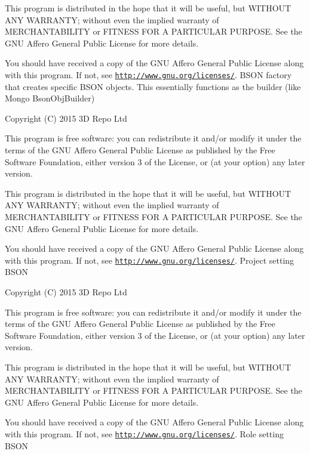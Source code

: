 This program is distributed in the hope that it will be useful, but W\+I\+T\+H\+O\+U\+T A\+N\+Y W\+A\+R\+R\+A\+N\+T\+Y; without even the implied warranty of M\+E\+R\+C\+H\+A\+N\+T\+A\+B\+I\+L\+I\+T\+Y or F\+I\+T\+N\+E\+S\+S F\+O\+R A P\+A\+R\+T\+I\+C\+U\+L\+A\+R P\+U\+R\+P\+O\+S\+E. See the G\+N\+U Affero General Public License for more details.

You should have received a copy of the G\+N\+U Affero General Public License along with this program. If not, see \href{http://www.gnu.org/licenses/}{\tt http\+://www.\+gnu.\+org/licenses/}. B\+S\+O\+N factory that creates specific B\+S\+O\+N objects. This essentially functions as the builder (like Mongo Bson\+Obj\+Builder)

Copyright (C) 2015 3\+D Repo Ltd

This program is free software\+: you can redistribute it and/or modify it under the terms of the G\+N\+U Affero General Public License as published by the Free Software Foundation, either version 3 of the License, or (at your option) any later version.

This program is distributed in the hope that it will be useful, but W\+I\+T\+H\+O\+U\+T A\+N\+Y W\+A\+R\+R\+A\+N\+T\+Y; without even the implied warranty of M\+E\+R\+C\+H\+A\+N\+T\+A\+B\+I\+L\+I\+T\+Y or F\+I\+T\+N\+E\+S\+S F\+O\+R A P\+A\+R\+T\+I\+C\+U\+L\+A\+R P\+U\+R\+P\+O\+S\+E. See the G\+N\+U Affero General Public License for more details.

You should have received a copy of the G\+N\+U Affero General Public License along with this program. If not, see \href{http://www.gnu.org/licenses/}{\tt http\+://www.\+gnu.\+org/licenses/}. Project setting B\+S\+O\+N

Copyright (C) 2015 3\+D Repo Ltd

This program is free software\+: you can redistribute it and/or modify it under the terms of the G\+N\+U Affero General Public License as published by the Free Software Foundation, either version 3 of the License, or (at your option) any later version.

This program is distributed in the hope that it will be useful, but W\+I\+T\+H\+O\+U\+T A\+N\+Y W\+A\+R\+R\+A\+N\+T\+Y; without even the implied warranty of M\+E\+R\+C\+H\+A\+N\+T\+A\+B\+I\+L\+I\+T\+Y or F\+I\+T\+N\+E\+S\+S F\+O\+R A P\+A\+R\+T\+I\+C\+U\+L\+A\+R P\+U\+R\+P\+O\+S\+E. See the G\+N\+U Affero General Public License for more details.

You should have received a copy of the G\+N\+U Affero General Public License along with this program. If not, see \href{http://www.gnu.org/licenses/}{\tt http\+://www.\+gnu.\+org/licenses/}. Role setting B\+S\+O\+N


